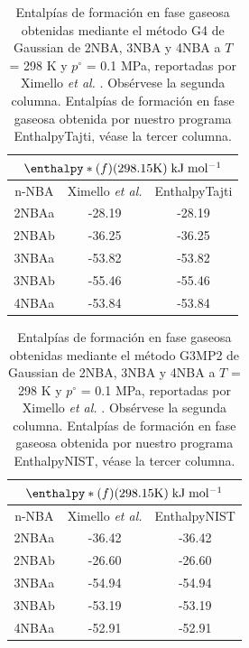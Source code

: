 \begin{table}[H]
\centering
\begin{tabular}{|c|c|c|}
\hline
	\multicolumn{3}{||c||}{$\enthalpy*(f){}(298.15 \mathrm{K})\; \mathrm{kJ\;mol^{-1}}$}\\
\hline
\hline
	n-NBA & Ximello \textit{et al.} \cite{Ximello2020} & EnthalpyTajti\\ 
\hline 
2NBAa & -28.19 & -28.19\\
\hline
2NBAb & -36.25 & -36.25\\ 
\hline 
3NBAa & -53.82 & -53.82\\
\hline
3NBAb & -55.46 & -55.46\\ 
\hline 
4NBAa & -53.84 & -53.84\\ 
\hline  
\end{tabular} 
	\caption[Entalpías de formación en fase gaseosa obtenidas mediante el método G4 de Gaussian de 2NBA, 3NBA y 4NBA a $T$ = 298 K y $p^{\circ}$ = 0.1 MPa, reportadas por Ximello \textit{et al.} \cite{Ximello2020}.] {Entalpías de formación en fase gaseosa obtenidas mediante el método G4 de Gaussian de 2NBA, 3NBA y 4NBA a $T$ = 298 K y $p^{\circ}$ = 0.1 MPa, reportadas por Ximello \textit{et al.} \cite{Ximello2020}. Obsérvese la segunda columna. Entalpías de formación en fase gaseosa obtenida por nuestro programa EnthalpyTajti, véase la tercer columna.}
\label{Ximello-table-1}
\end{table}

\begin{table}[H]
\centering
\begin{tabular}{|c|c|c|}
\hline
	\multicolumn{3}{||c||}{$\enthalpy*(f){}(298.15 \mathrm{K})\; \mathrm{kJ\;mol^{-1}}$}\\
\hline
\hline
	n-NBA & Ximello \textit{et al.} \cite{Ximello2020} & EnthalpyNIST\\ 
\hline 
2NBAa & -36.42 & -36.42\\
\hline
2NBAb & -26.60 & -26.60\\ 
\hline 
3NBAa & -54.94 & -54.94\\
\hline
3NBAb & -53.19 & -53.19\\ 
\hline 
4NBAa & -52.91 & -52.91\\ 
\hline  
\end{tabular} 
	\caption[Entalpías de formación en fase gaseosa obtenidas mediante el método G3MP2 de Gaussian de 2NBA, 3NBA y 4NBA a $T$ = 298 K y $p^{\circ}$ = 0.1 MPa, reportadas por Ximello \textit{et al.} \cite{Ximello2020}.] {Entalpías de formación en fase gaseosa obtenidas mediante el método G3MP2 de Gaussian de 2NBA, 3NBA y 4NBA a $T$ = 298 K y $p^{\circ}$ = 0.1 MPa, reportadas por Ximello \textit{et al.} \cite{Ximello2020}. Obsérvese la segunda columna. Entalpías de formación en fase gaseosa obtenida por nuestro programa EnthalpyNIST, véase la tercer columna.}
\label{Ximello-table-2}
\end{table}

